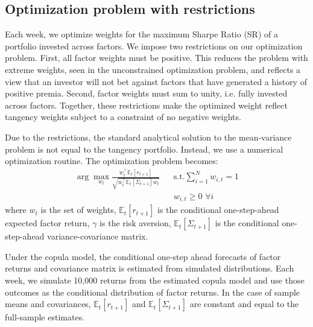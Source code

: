 \subsection{Optimization problem with restrictions}

Each week, we optimize weights for the maximum Sharpe Ratio (SR) of a portfolio invested across factors. We impose two restrictions on our optimization problem. First, all factor weights must be positive. This reduces the problem with extreme weights, seen in the unconstrained optimization problem, and reflects a view that an investor will not bet against factors that have generated a history of positive premia. Second, factor weights must sum to unity, i.e. fully invested across factors. Together, these restrictions make the optimized weight reflect tangency weights subject to a constraint of no negative weights.


Due to the restrictions, the standard analytical solution to the mean-variance problem is not equal to the tangency portfolio. Instead, we use a numerical optimization routine. The optimization problem becomes:
\begin{align*}
  \arg\!\max_{w_t} \frac{w_t^\top \mathbb{E}_t[r_{t+1}]}{\sqrt{w_t^\top \mathbb{E}_t[\Sigma_{t+1}] w_t}}
    && \text{s.t.} \sum_{i=1}^N w_{i,t} = 1 \\
    && w_{i,t} \ge 0 \,\, \forall i
\end{align*}
where $w_t$ is the set of weights, $\mathbb{E}_t[r_{t+1}]$ is the conditional one-step-ahead expected factor return, $\gamma$ is the risk aversion, $\mathbb{E}_t[\Sigma_{t+1}]$ is the conditional one-step-ahead variance-covariance matrix. 

Under the copula model, the conditional one-step ahead forecasts of factor returns and covariance matrix is estimated from simulated distributions. Each week, we simulate 10,000 returns from the estimated copula model and use those outcomes as the conditional distribution of factor returns. In the case of sample means and covariances, $\mathbb{E}_t[r_{t+1}]$ and $\mathbb{E}_t[\Sigma_{t+1}]$ are constant and equal to the full-sample estimates.

